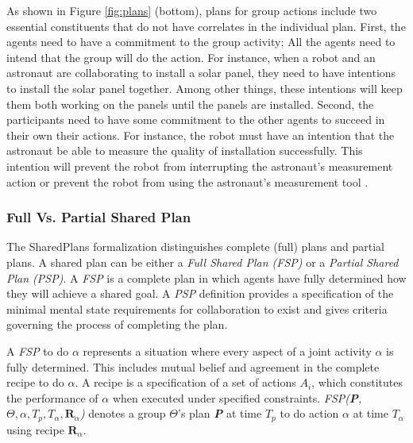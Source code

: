 \documentclass[12pt]{report}
\begin{document}
As shown in Figure \ref{fig:plans} (bottom), plans for group actions include two
essential constituents that do not have correlates in the individual plan.
First, the agents need to have a commitment to the group activity; All the
agents need to intend that the group will do the action. For instance, when a
robot and an astronaut are collaborating to install a solar panel, they need to
have intentions to install the solar panel together. Among other things, these
intentions will keep them both working on the panels until the panels are
installed. Second, the participants need to have some commitment to the other
agents to succeed in their own their actions. For instance, the robot must have
an intention that the astronaut be able to measure the quality of installation
successfully. This intention will prevent the robot from interrupting the
astronaut's measurement action or prevent the robot from using the astronaut's
measurement tool \cite{grosz:collaborative-systems, grosz:plans-discourse}.

\subsubsection{Full Vs. Partial Shared Plan}
\label{sec:full-partial-plan}

The SharedPlans formalization distinguishes complete (full) plans and partial
plans. A shared plan can be either a \textit{Full Shared Plan (FSP)} or a
\textit{Partial Shared Plan (PSP)}. A \textit{FSP} is a complete plan in which
agents have fully determined how they will achieve a shared goal. A \textit{PSP}
definition provides a specification of the minimal mental state requirements for
collaboration to exist and gives criteria governing the process of completing
the plan.

A \textit{FSP} to do $\alpha$ represents a situation where every aspect of a
joint activity $\alpha$ is fully determined. This includes mutual belief and
agreement in the complete recipe to do $\alpha$. A recipe is a specification of
a set of actions \textit{$A_i$}, which constitutes the performance of $\alpha$
when executed under specified constraints. \textit{FSP(\textbf{P}, $\Theta,
\alpha, T_p, T_\alpha, \textbf{R}_\alpha$)} denotes a group $\Theta$'s plan
\textit{\textbf{P}} at time \textit{$T_p$} to do action $\alpha$ at time
\textit{$T_\alpha$} using recipe \textit{$\textbf{R}_\alpha$}. 
\end{document}
